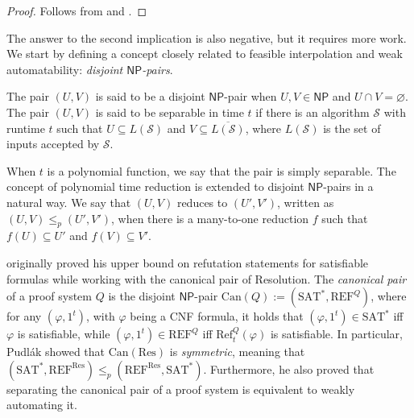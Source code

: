 \begin{proof}
    Follows from  and .
\end{proof}

The answer to the second implication is also negative, but it requires more work. We start by defining a concept closely related to feasible interpolation and weak automatability: \textit{disjoint $\mathsf{NP}$-pairs}.

\begin{definition}
    The pair $(U,V)$ is said to be a disjoint $\mathsf{NP}$-pair when $U,V \in \mathsf{NP}$ and $U \cap V = \varnothing$. The pair $(U,V)$ is said to be separable in time $t$ if there is an algorithm $\mathcal{S}$ with runtime $t$ such that $U \subseteq L(\mathcal{S})$ and $V \subseteq \overline{L(\mathcal{S})}$, where $L(\mathcal{S})$ is the set of inputs accepted by $\mathcal{S}$.
\end{definition}

When $t$ is a polynomial function, we say that the pair is simply separable. The concept of polynomial time reduction is extended to disjoint $\mathsf{NP}$-pairs in a natural way. We say that $(U,V)$ reduces to $(U',V')$, written as $(U,V) \leq_p (U', V')$, when there is a many-to-one reduction $f$ such that $f(U) \subseteq U'$ and $f(V) \subseteq V'$. 

\textcite{pudlak_upper} originally proved his upper bound on refutation statements for satisfiable formulas while working with the canonical pair of Resolution. The \textit{canonical pair} of a proof system $Q$ \cite{razborov_np_pairs} is the disjoint $\mathsf{NP}$-pair $\mathrm{Can}(Q) := (\mathrm{SAT}^*, \mathrm{REF}^Q)$, where for any $(\varphi, 1^t)$, with $\varphi$ being a CNF formula, it holds that $(\varphi, 1^t) \in \mathrm{SAT}^*$ iff $\varphi$ is satisfiable, while $(\varphi, 1^t) \in \mathrm{REF}^Q$ iff $\mathrm{Ref}^Q_t(\varphi)$ is satisfiable. In particular, Pudlák showed that $\mathrm{Can}(\mathrm{Res})$ is \textit{symmetric}, meaning that $(\mathrm{SAT}^*, \mathrm{REF}^\mathrm{Res}) \leq_p (\mathrm{REF}^{\mathrm{Res}}, \mathrm{SAT}^*)$. Furthermore, he also proved that separating the canonical pair of a proof system is equivalent to weakly automating it.


